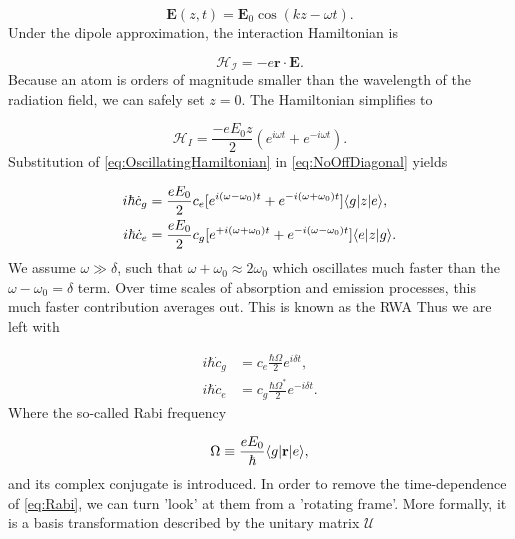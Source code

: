 \begin{equation}\label{eq:CosineLightField}
	\mathbf{E}(z,t) = \mathbf{E}_0 \cos{(k z - \omega t)}.
\end{equation}
Under the dipole approximation, the interaction Hamiltonian is \cite{Foot2005}

\begin{equation}
	\mathcal{H_I} = - e\mathbf{r}\cdot \mathbf{E}.
\end{equation}
Because an atom is orders of magnitude smaller than the wavelength of the radiation field, we can safely set $z=0$. The Hamiltonian simplifies to 

\begin{equation}\label{eq:OscillatingHamiltonian}
	\mathcal{H}_I = \frac{-e E_0 z}{2} \left(e^{i \omega t} + e^{-i \omega t}\right).
\end{equation}
Substitution of \cref{eq:OscillatingHamiltonian} in \cref{eq:NoOffDiagonal} yields

\begin{subequations}\label{eq:ClassicalHamSubstituted}
	\begin{align}
		i \hbar \dot{c}_g &= \frac{e E_0}{2} c_e[e^{ i (\omega-\omega_0) t}+e^{-i(\omega+ \omega_0)t}] \langle g\rvert z \lvert e\rangle, \\
		i \hbar \dot{c}_e &= \frac{e E_0}{2} c_g[e^{+i (\omega+\omega_0) t}+e^{-i(\omega- \omega_0)t}] \langle e\rvert z \lvert g\rangle.
	\end{align}
\end{subequations}
We assume $\omega \gg \delta$, such that $\omega+\omega_0 \approx 2\omega_0$ which oscillates much faster than the $\omega-\omega_0=\delta$ term. Over time scales of absorption and emission processes, this much faster contribution averages out. This is known as the \ac{RWA} \cite{Vredenbregt2020,Loudon2000} Thus we are left with

\begin{subequations}\label{eq:Rabi}
	\begin{align}
		i \hbar \dot{c}_g &= c_e \frac{\hbar \Omega  }{2} e^{ i \delta t},\\
		i \hbar \dot{c}_e &= c_g \frac{\hbar \Omega^*}{2} e^{-i \delta t}.
	\end{align}
\end{subequations}
Where the so-called Rabi frequency 

\begin{equation}\label{eq:RabiFrequency}
	\Omega \equiv \frac{e E_0}{\hbar} \langle g\rvert\mathbf{r}\lvert e\rangle,
\end{equation}
and its complex conjugate is introduced. In order to remove the time-dependence of \cref{eq:Rabi}, we can turn 'look' at them from a 'rotating frame'. More formally, it is a basis transformation described by the unitary matrix $\mathcal{U}$ \cite{Foot2005}

